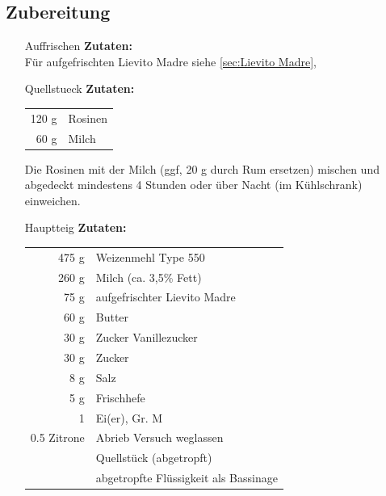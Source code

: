 \subsection*{Zubereitung}
\begin{enumerate}
    \item [\Gls{Auffrischen}] \textbf{Zutaten:}\\
         Für aufgefrischten Lievito Madre siehe \vref{sec:Lievito Madre},
    
    \item [\Gls{Quellstueck}] \textbf{Zutaten:}\\
        \begin{tabular}{r l}
            120 g  & Rosinen  \\
            60 g &  Milch  
        \end{tabular}
        
        Die Rosinen mit der Milch (ggf, 20 g durch Rum ersetzen) mischen und abgedeckt mindestens 4 Stunden oder über Nacht (im Kühlschrank) einweichen.
    \item  [\Gls{Hauptteig}] \textbf{Zutaten:}\\
        \begin{tabular}{r l}
            475 g & Weizenmehl Type 550                   \\
            260 g & Milch (ca. 3,5\% Fett)                \\
            75 g & aufgefrischter Lievito Madre          \\
            60 g & Butter                                \\
            30 g & Zucker Vanillezucker                  \\
            30 g & Zucker                                \\
            8 g & Salz                                  \\
            5 g & Frischhefe                            \\
            1 & Ei(er), Gr. M                         \\
            0.5 Zitrone & Abrieb Versuch weglassen              \\
            & Quellstück (abgetropft)               \\
            & abgetropfte Flüssigkeit als Bassinage
        \end{tabular}
        

\end{enumerate}
